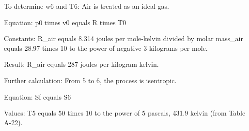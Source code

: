 To determine w6 and T6:  
Air is treated as an ideal gas.  

Equation:  
p0 times v0 equals R times T0  

Constants:  
R_air equals 8.314 joules per mole-kelvin divided by molar mass_air equals 28.97 times 10 to the power of negative 3 kilograms per mole.  

Result:  
R_air equals 287 joules per kilogram-kelvin.  

Further calculation:  
From 5 to 6, the process is isentropic.  

Equation:  
Sf equals S6  

Values:  
T5 equals 50 times 10 to the power of 5 pascals, 431.9 kelvin (from Table A-22).